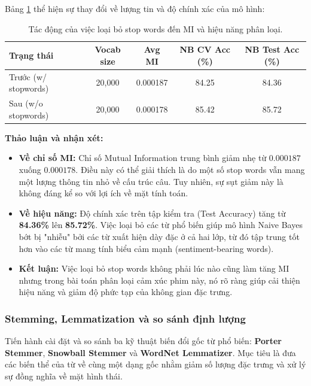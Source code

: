 \documentclass[12pt,a4paper]{article}
\begin{document}
Bảng \ref{tab:stopwords_comparison} thể hiện sự thay đổi về lượng tin và độ chính xác của mô hình:

\begin{table}[H]
    \centering
    \caption{Tác động của việc loại bỏ stop words đến MI và hiệu năng phân loại.}
    \label{tab:stopwords_comparison}
    \small
    \begin{tabular}{lcccc}
        \toprule
        \textbf{Trạng thái} & \textbf{Vocab size} & \textbf{Avg MI} & \textbf{NB CV Acc (\%)} & \textbf{NB Test Acc (\%)} \\
        \midrule
        Trước (w/ stopwords) & 20,000 & 0.000187 & 84.25 & 84.36 \\
        Sau (w/o stopwords) & 20,000 & 0.000178 & 85.42 & 85.72 \\
        \bottomrule
    \end{tabular}
\end{table}

\textbf{Thảo luận và nhận xét:}
\begin{itemize}
    \item \textbf{Về chỉ số MI:} Chỉ số Mutual Information trung bình giảm nhẹ từ $0.000187$ xuống $0.000178$. Điều này có thể giải thích là do một số stop words vẫn mang một lượng thông tin nhỏ về cấu trúc câu. Tuy nhiên, sự sụt giảm này là không đáng kể so với lợi ích về mặt tính toán.
    \item \textbf{Về hiệu năng:} Độ chính xác trên tập kiểm tra (Test Accuracy) tăng từ \textbf{84.36\%} lên \textbf{85.72\%}. Việc loại bỏ các từ phổ biến giúp mô hình Naive Bayes bớt bị "nhiễu" bởi các từ xuất hiện dày đặc ở cả hai lớp, từ đó tập trung tốt hơn vào các từ mang tính biểu cảm mạnh (sentiment-bearing words).
    \item \textbf{Kết luận:} Việc loại bỏ stop words không phải lúc nào cũng làm tăng MI nhưng trong bài toán phân loại cảm xúc phim này, nó rõ ràng giúp cải thiện hiệu năng và giảm độ phức tạp của không gian đặc trưng.
\end{itemize}
\subsubsection{Stemming, Lemmatization và so sánh định lượng}
Tiến hành cài đặt và so sánh ba kỹ thuật biến đổi gốc từ phổ biến: \textbf{Porter Stemmer}, \textbf{Snowball Stemmer} và \textbf{WordNet Lemmatizer}. Mục tiêu là đưa các biến thể của từ về cùng một dạng gốc nhằm giảm số lượng đặc trưng và xử lý sự đồng nghĩa về mặt hình thái.
\end{document}
